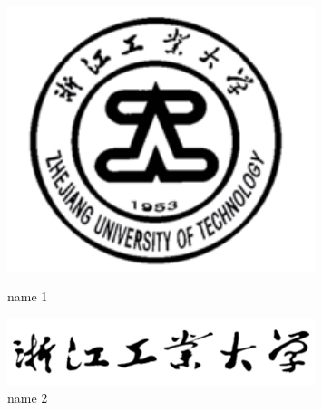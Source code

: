 \documentclass[a4paper,12pt]{ctexart}
\begin{document}
\begin{figure}[H]
  \centering %
  \begin{minipage}[b]{0.45\textwidth} %
    \centering %
    \includegraphics[width=0.8\textwidth]{./img/校徽.png} %
    \caption{name 1}
    \label{Fig.1}
  \end{minipage}
  \begin{minipage}[b]{0.45\textwidth} %
    \centering %
    \includegraphics[width=0.8\textwidth]{./img/校名.png}%
    \caption{name 2}
    \label{Fig.2}
  \end{minipage}
\end{figure}
\end{document}
